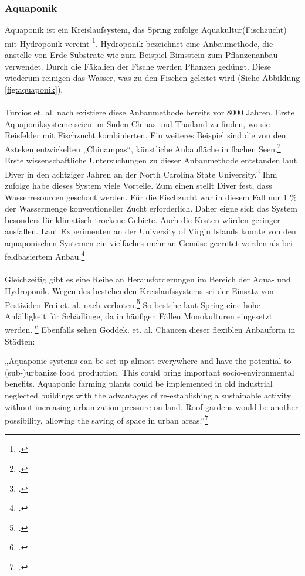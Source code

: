 \documentclass{scrartcl}
\begin{document}
\subsubsection{Aquaponik}
Aquaponik ist ein Kreislaufsystem, das Spring zufolge Aquakultur(Fischzucht) mit Hydroponik vereint \footcite[Vgl.][S.44f]{Spring2012DerBasel-Stadt}. Hydroponik bezeichnet eine Anbaumethode, die anstelle von Erde Substrate wie zum Beispiel Bimsstein zum Pflanzenanbau verwendet. Durch die Fäkalien der Fische werden Pflanzen gedüngt. Diese wiederum reinigen das Wasser, was zu den Fischen geleitet wird (Siehe Abbildung \ref{fig:aquaponik}). \\
\\
Turcios et. al. nach existiere diese Anbaumethode bereits vor 8000 Jahren. Erste Aquaponiksysteme seien im Süden Chinas und Thailand zu finden, wo sie Reisfelder mit Fischzucht kombinierten. Ein weiteres Beispiel sind die von den Azteken entwickelten „Chinampas“, künstliche Anbaufläche in flachen Seen.\footcite[Vgl.][S.838]{Turcios2014SustainableFuture} Erste wissenschaftliche Untersuchungen zu dieser Anbaumethode entstanden laut Diver in den achtziger Jahren an der North Carolina State University.\footcite[Vgl.][S.4]{Diver2006Aquaponics-IntegrationAquaculture} 
Ihm zufolge habe dieses System viele Vorteile. Zum einen stellt Diver fest, dass Wasserresourcen geschont werden. Für die Fischzucht war in diesem Fall nur 1 \% der Wassermenge konventioneller Zucht erforderlich. Daher eigne sich das System besonders für klimatisch trockene Gebiete. Auch die Kosten würden geringer ausfallen. Laut Experimenten an der University of Virgin Islands konnte von den aquaponischen Systemen ein vielfaches mehr an Gemüse geerntet werden als bei feldbasiertem Anbau.\footcite[Vgl.][S.7f]{Diver2006Aquaponics-IntegrationAquaculture}  \\
\\Gleichzeitig gibt es eine Reihe an Herausforderungen im Bereich der Aqua- und Hydroponik. Wegen des bestehenden Kreislaufssystems sei der Einsatz von Pestiziden Frei et. al. nach verboten.\footcite[S.43]{FreiMatthiasHartmann2007AquaponikGemuse.}  So bestehe laut Spring eine hohe Anfälligkeit für Schädlinge, da in häufigen Fällen Monokulturen eingesetzt werden. \footcite[S.27]{Spring2012DerBasel-Stadt} Ebenfalls sehen Goddek. et. al. Chancen dieser flexiblen Anbauform in Städten:

\begin{displayquote}
„Aquaponic systems can be set up almost everywhere and have the potential to (sub-)urbanize food production. This could bring important socio-environmental benefits. Aquaponic farming plants could be implemented in old industrial neglected buildings with the advantages of re-establishing a sustainable activity without increasing urbanization pressure on land. Roof gardens would be another possibility, allowing the saving of space in urban areas.“\footcites[S.4214]{Goddek2015ChallengesAquaponics}
\end{displayquote}
\end{document}
